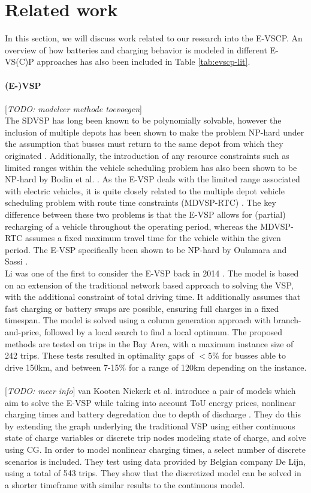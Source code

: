 \documentclass[ht]{article}
\newcommand{\todo}[1]{{\color{red}[\textit{TODO: #1}]}}
\begin{document}
\section{Related work}
In this section, we will discuss work related to our research into the E-VSCP.
An overview of how batteries and charging behavior is modeled in different
E-VS(C)P approaches has also been included in Table \ref{tab:evscp-lit}. \\\\
\noindent \textbf{(E-)VSP} \\\\ \todo{modeleer methode toevoegen}\\ The SDVSP
has long been known to be polynomially solvable, however the inclusion of
multiple depots has been shown to make the problem NP-hard under the assumption
that busses must return to the same depot from which they originated
\cite{Bunte2009}. Additionally, the introduction of any resource constraints
such as limited ranges within the vehicle scheduling problem has also been
shown to be NP-hard by Bodin et al. \cite{Bodin1983}. As the E-VSP deals with
the limited range associated with electric vehicles, it is quite closely
related to the multiple depot vehicle scheduling problem with route time
constraints (MDVSP-RTC) \cite{Haghani2002}. The key difference between these
two problems is that the E-VSP allows for (partial) recharging of a vehicle
throughout the operating period, whereas the MDVSP-RTC assumes a fixed maximum
travel time for the vehicle within the given period. The E-VSP specifically
been shown to be NP-hard by Oulamara and Sassi \cite{Sassi2014}. \\
\cite{Haghani2002} Li was one of the first to consider the E-VSP back in 2014
\cite{Li2014}. The model is based on an extension of the traditional network
based approach to solving the VSP, with the additional constraint of total
driving time. It additionally assumes that fast charging or battery swaps are
possible, ensuring full charges in a fixed timespan. The model is solved using
a column generation approach with branch-and-price, followed by a local search
to find a local optimum. The proposed methods are tested on trips in the Bay
Area, with a maximum instance size of 242 trips. These tests resulted in
optimality gaps of $<5\%$ for busses able to drive 150km, and between 7-15\%
for a range of 120km depending on the instance. \\\\ \todo{meer info} van
Kooten Niekerk et al. introduce a pair of models which aim to solve the E-VSP
while taking into account ToU energy prices, nonlinear charging times and
battery degredation due to depth of discharge \cite{vanKootenNiekerk2017}. They
do this by extending the graph underlying the traditional VSP using either
continuous state of charge variables or discrete trip nodes modeling state of
charge, and solve using CG. In order to model nonlinear charging times, a
select number of discrete scenarios is included. They test using data provided
by Belgian company De Lijn, using a total of 543 trips. They show that the
discretized model can be solved in a shorter timeframe with similar results to
the continuous model. \\\\
\end{document}
